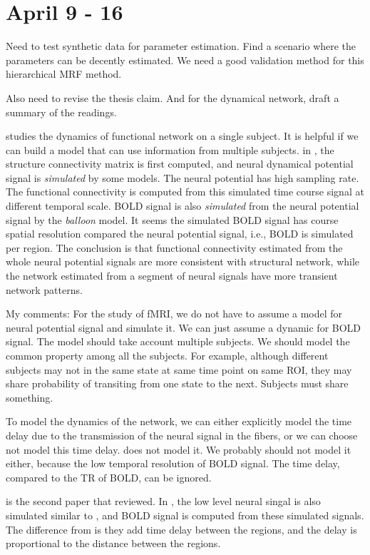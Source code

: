 \documentclass[12pt]{article}
\begin{document}
\section{April 9 - 16}
Need to test synthetic data for parameter estimation. Find a scenario where the
parameters can be decently estimated. We need a good validation method for this
hierarchical MRF method.

Also need to revise the thesis claim. And for the dynamical network, draft a
summary of the readings.

\citet{honey2007network} studies the dynamics of functional network on a single
subject. It is helpful if we can build a model that can use information from
multiple subjects. in \cite{honey2007network}, the structure connectivity matrix
is first computed, and neural dynamical potential signal is \emph{simulated} by
some models. The neural potential has high sampling rate. The functional
connectivity is computed from this simulated time course signal at different
temporal scale. BOLD signal is also \emph{simulated} from the neural potential
signal by the \emph{balloon} model. It seems the simulated BOLD signal has
course spatial resolution compared the neural potential signal, i.e., BOLD is
simulated per region. The conclusion is that functional connectivity estimated
from the whole neural potential signals are more consistent with structural
network, while the network estimated from a segment of neural signals have more
transient network patterns.

My comments: For the study of fMRI, we do not have to assume a model for neural
potential signal and simulate it. We can just assume a dynamic for BOLD
signal. The model should take account multiple subjects. We should model the
common property among all the subjects. For example, although different subjects
may not in the same state at same time point on same ROI, they may share
probability of transiting from one state to the next. Subjects must share
something.

To model the dynamics of the network, we can either explicitly model the time
delay due to the transmission of the neural signal in the fibers, or we can
choose not model this time delay. \cite{honey2007network} does not model it. We
probably should not model it either, because the low temporal resolution of BOLD
signal. The time delay, compared to the TR of BOLD, can be ignored.

\cite{ghosh2008noise} is the second paper that \citet{deco2010emerging}
reviewed. In \citeauthor{ghosh2008noise}, the low level neural singal is also
simulated similar to \citeauthor{honey2007network}, and BOLD signal is computed
from these simulated signals. The difference from \citeauthor{honey2007network}
is they add time delay between the regions, and the delay is proportional to the
distance between the regions.
\end{document}
